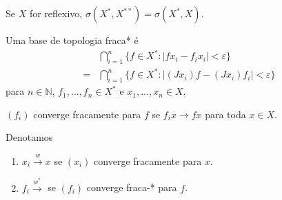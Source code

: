 \documentclass[portuguese]{article}
\theoremstyle{definition}
\newcommand{\N}{\mathbb{N}}
\begin{document}
	\begin{obs}
		Se $X$ for reflexivo, $\sigma(X^*,X^{**})=\sigma(X^*,X)$.
	\end{obs}
	
	Uma base de topologia fraca* é
	\begin{align*}
		&\bigcap_{i=1}^n\{f\in X^*:|fx_i-f_ix_i|<\varepsilon\}\\
		=&\bigcap_{i=1}^n\{f\in X^*:|(Jx_i)f-(Jx_i)f_i|<\varepsilon\}
	\end{align*}
	para $n\in\N$, $f_1,\ldots,f_n\in X^*$ e $x_1,\ldots,x_n\in X$.
	
	$(f_i)$ converge fracamente para $f$ se $f_ix\to fx$ para toda $x\in X$.
	
	Denotamos
	\begin{enumerate}
		\item $x_i\overset{w}{\longrightarrow}x$ se $(x_i)$ converge fracamente para $x$.
		\item $f_i\overset{w^*}{\longrightarrow}$ se $(f_i)$ converge fraca-* para $f$.
	\end{enumerate}
	
\end{document}
